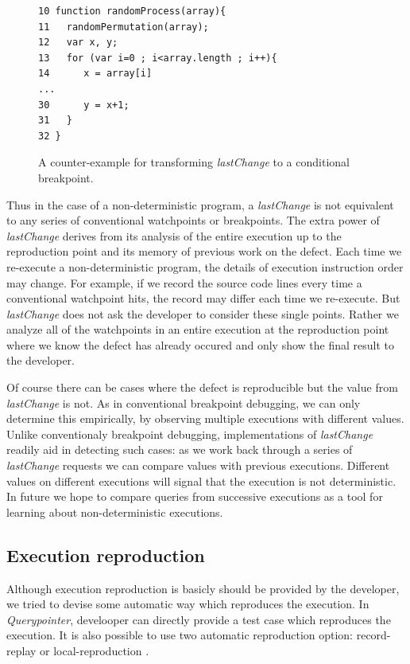 \documentclass[preprint]{sigplanconf}
\begin{document}
\begin{figure}[htp]
\begin{verbatim}
10 function randomProcess(array){
11   randomPermutation(array);
12   var x, y;
13   for (var i=0 ; i<array.length ; i++){
14      x = array[i]
...
30      y = x+1;
31   }
32 }
\end{verbatim}
\caption{A counter-example for transforming \textit{lastChange} to a conditional breakpoint.}
\label{fig:counter-example}
\end{figure}
 

Thus in the case of a non-deterministic program, a \textit{lastChange}
is not equivalent to any series of conventional watchpoints or
breakpoints. The extra power of \textit{lastChange} derives from its
analysis of the entire execution up to the reproduction point and its
memory of previous work on the defect.  Each time we re-execute a
non-deterministic program, the details of execution instruction order
may change. For example, if we record the source code lines every time
a conventional watchpoint hits, the record may differ each time we
re-execute. But \textit{lastChange} does not ask the developer to
consider these single points.  Rather we analyze all of the
watchpoints in an entire execution at the reproduction point where we
know the defect has already occured and only show the final result to
the developer.

Of course there can be cases where the defect is reproducible but the
value from \textit{lastChange} is not. As in conventional breakpoint
debugging, we can only determine this empirically, by observing
multiple executions with different values. Unlike conventionaly
breakpoint debugging, implementations of \textit{lastChange} readily
aid in detecting such cases: as we work back through a series of
\textit{lastChange} requests we can compare values with previous
executions. Different values on different executions will signal that
the execution is not deterministic. In future we hope to compare
queries from successive executions as a tool for learning about
non-deterministic executions.

\subsection{Execution reproduction}
Although execution reproduction is basicly should be provided by the
developer, we tried to devise some automatic way which reproduces the
execution. In \textit{Querypointer}, develooper can directly provide a
test case which reproduces the execution. It is also possible to use
two automatic reproduction option: record-replay or local-reproduction
.
\end{document}

